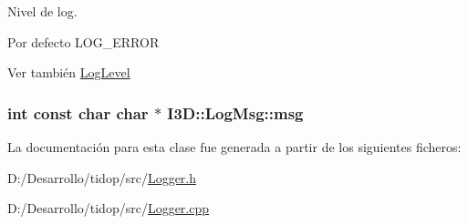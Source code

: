 Nivel de log. 

Por defecto L\+O\+G\+\_\+\+E\+R\+R\+OR \begin{DoxySeeAlso}{Ver también}
\hyperlink{namespace_i3_d_ae1af0f2e3b629610c45222809ff521f6}{Log\+Level} 
\end{DoxySeeAlso}
\subsubsection[{\texorpdfstring{msg}{msg}}]{\setlength{\rightskip}{0pt plus 5cm}int const char char $\ast$ I3\+D\+::\+Log\+Msg\+::msg}\hypertarget{class_i3_d_1_1_log_msg_a5a1ceb27d9529de8eb9b3fc9377e178a}{}\label{class_i3_d_1_1_log_msg_a5a1ceb27d9529de8eb9b3fc9377e178a}


La documentación para esta clase fue generada a partir de los siguientes ficheros\+:\begin{DoxyCompactItemize}
\item 
D\+:/\+Desarrollo/tidop/src/\hyperlink{_logger_8h}{Logger.\+h}\item 
D\+:/\+Desarrollo/tidop/src/\hyperlink{_logger_8cpp}{Logger.\+cpp}\end{DoxyCompactItemize}
